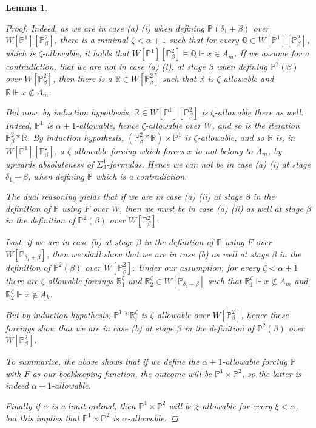 \documentclass[a4paper,11pt]{article}
\newtheorem{lemma}[theorem]{Lemma}
\newcommand{\forceP}{\mathbb{P}}
\newcommand{\forceQ}{\mathbb{Q}}
\newcommand{\forceR}{\mathbb{R}}
\begin{document}
\begin{lemma}
\begin{proof}
Indeed, as we are in case (a) (i) when defining $\forceP(\delta_1+ \beta )$ over $W [\forceP^1 ] [ \forceP^2_{\beta} ]$, there is a minimal $\zeta< \alpha+1$ such that for every $\forceQ \in W[\forceP^1 ] [\forceP^2_{\beta}]$, which is $\zeta$-allowable, it holds that $W [\forceP^1] [\forceP^2_{\beta}] \models \forceQ \Vdash x \in A_m$. If we assume for a contradiction, that we are not in case (a) (i), 
at stage $\beta$ when defining $\forceP^2(\beta)$ over $W[\forceP^2_{\beta}]$, then there is a $\forceR \in W[\forceP^2_{\beta}]$ such that
$\forceR$ is $\zeta$-allowable and $\forceR \Vdash x \notin A_m$.

But now, by induction hypothesis, $\forceR \in W[\forceP^1 ][\forceP^2_{\beta}]$ is $\zeta$-allowable there as well. Indeed, $\forceP^1$ is $\alpha+1$-allowable, hence $\zeta$-allowable over $W$, and so is the iteration $\forceP^2_{\beta} \ast \forceR$.  By induction hypothesis, $(\forceP^2_{\beta} \ast \forceR) \times \forceP^1  $ is $\zeta$-allowable, and so $\forceR$ is, in $W[\forceP^1] [\forceP^2_{\beta}]$, a $\zeta$-allowable forcing which forces $x$ to not belong to $A_m$, by upwards absoluteness of $\Sigma^1_3$-formulas. Hence we can not be in case (a) (i)  at stage $\delta_1 + \beta$, when defining $\forceP$ which is a contradiction.

The dual reasoning yields that if we are in case (a) (ii) at stage $\beta$  in the definition of $\forceP$ using $F$ over $W$, then we must be in case (a) (ii) as well  at stage $\beta$ in the definition of $\forceP^2(\beta)$ over $W[\forceP^2_{\beta}].$

Last, if we are in case (b) at stage $\beta$ in the definition of $\forceP$ using $F$ over $W[ \forceP_{\delta_1 +\beta} ]$, then we shall show that we are in case (b) as well at stage $\beta$ in the definition of $\forceP^2(\beta)$ over $W[\forceP^2_{\beta}]$. Under our assumption, for every $\zeta < \alpha+1$ there are $\zeta$-allowable forcings $\forceR^{\zeta}_1$ and $\forceR^{\zeta}_2 \in W[\forceP_{\delta_1 +\beta}]$ such that
$\forceR^{\zeta}_1 \Vdash x \notin A_m$ and $\forceR^{\zeta}_2 \Vdash x \notin A_k$.

But by induction hypothesis, $\forceP^1 \ast \forceR^{\zeta}_i$ is $\zeta$-allowable over $W[\forceP^2_{\beta}]$, hence these forcings show that we are in case (b) at stage $\beta$ in the definition of $\forceP^2(\beta)$ over $W[\forceP^2_{\beta}]$.

To summarize, the above shows that if we define the $\alpha+1$-allowable forcing $\forceP$ with $F$ as our bookkeeping function, the outcome will be $\forceP^1 \times \forceP^2$, so the latter is indeed $\alpha+1$-allowable. 

Finally if $\alpha$ is a limit ordinal, then $\forceP^1 \times \forceP^2$ will be $\xi$-allowable for every $\xi < \alpha$, but this implies that $\forceP^1 \times \forceP^2$ is $\alpha$-allowable.
\end{proof}
\end{lemma}
\end{document}
